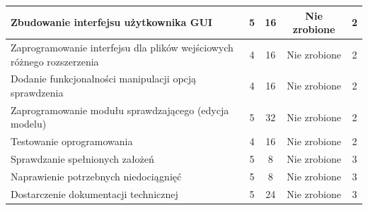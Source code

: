 \documentclass[a4paper, 12pt]{article}
\begin{document}
\begin{center}
\begin{tabular}{|p{}|c|c|c|c|}
\hline
Zbudowanie interfejsu użytkownika GUI & 5 & 16 & Nie zrobione & 2 \\
\hline
Zaprogramowanie interfejsu dla plików wejściowych różnego rozszerzenia & 4 & 16 & Nie zrobione & 2 \\
\hline
Dodanie funkcjonalności manipulacji opcją sprawdzenia & 4 & 16 & Nie zrobione & 2 \\
\hline
Zaprogramowanie modułu sprawdzającego (edycja modelu) & 5 & 32 & Nie zrobione & 2 \\
\hline
Testowanie oprogramowania & 4 & 16 & Nie zrobione & 2 \\
\hline
Sprawdzanie spełnionych założeń & 5 & 8 & Nie zrobione & 3 \\
\hline
Naprawienie potrzebnych niedociągnięć & 5 & 8 & Nie zrobione & 3 \\
\hline
Dostarczenie dokumentacji technicznej & 5 & 24 & Nie zrobione & 3 \\
\hline
\end{tabular}
\end{center}
\end{document}
